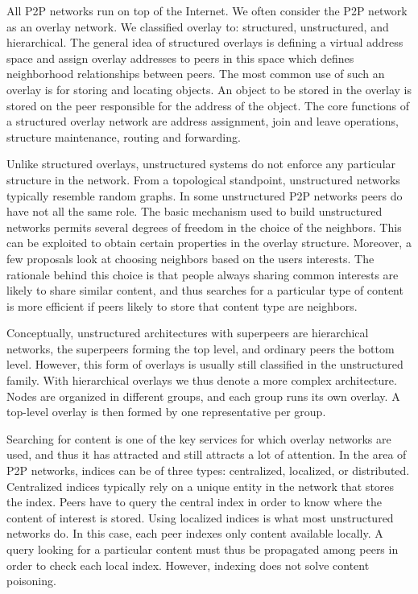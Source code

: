 All P2P networks run on top of the Internet. 
We often consider the P2P network as an overlay network.
We classified overlay to: structured, unstructured, and hierarchical. 
The general idea of structured overlays is defining a virtual address space and assign overlay addresses to peers in this space which defines neighborhood relationships between peers.
The most common use of such an overlay is for storing and locating objects. 
An object to be stored in the overlay is stored on the peer responsible for the address of the object.
The core functions of a structured overlay network are address assignment, join and leave operations, structure maintenance, routing and forwarding.

Unlike structured overlays, unstructured systems do not enforce any particular structure in the network. 
From a topological standpoint, unstructured networks typically resemble random graphs. 
In some unstructured P2P networks peers do have not all the same role. 
The basic mechanism used to build unstructured networks permits several degrees of freedom in the choice of the neighbors. 
This can be exploited to obtain certain properties in the overlay structure. 
Moreover, a few proposals look at choosing neighbors based on the users interests. 
The rationale behind this choice is that people always sharing common interests are likely to share similar content, and thus searches for a particular type of content is more efficient if peers likely to store that content type are neighbors. 

Conceptually, unstructured architectures with superpeers are hierarchical networks, the superpeers forming the top level, and ordinary peers the bottom level.
However, this form of overlays is usually still classified in the unstructured family. 
With hierarchical overlays we thus denote a more complex architecture. 
Nodes are organized in different groups, and each group runs its own overlay. 
A top-level overlay is then formed by one representative per group. 

Searching for content is one of the key services for which overlay networks are used, and thus it has attracted  and still attracts  a lot of attention.
In the area of P2P networks, indices can be of three types: centralized, localized, or distributed. 
Centralized indices typically rely on a unique entity in the network that stores the index. 
Peers have to query the central index in order to know where the content of interest is stored.
Using localized indices is what most unstructured networks do. 
In this case, each peer indexes only content available locally. 
A query looking for a particular content must thus be propagated among peers in order to check each local index.
However, indexing does not solve content poisoning.

